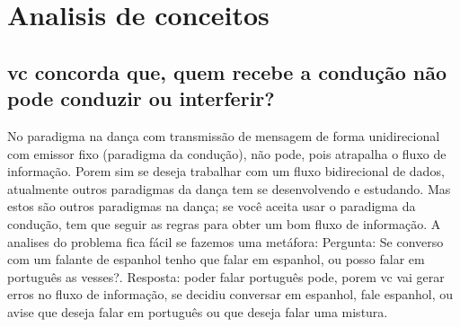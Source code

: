 \documentclass[a4paper,10pt]{article}
\begin{document}
\section{Analisis de conceitos}

\subsection{vc concorda que, quem recebe a condução não pode conduzir ou interferir?﻿}
No paradigma na dança com transmissão de mensagem de forma unidirecional com emissor fixo (paradigma da condução), 
não pode, pois atrapalha o fluxo de informação. 
Porem sim se deseja trabalhar com um fluxo bidirecional de dados, 
atualmente outros paradigmas da dança tem se desenvolvendo e estudando. 
Mas estos são outros paradigmas na dança;
se você aceita usar o paradigma da condução, 
tem que seguir as regras para obter um bom fluxo de informação. 
A analises do problema fica fácil se fazemos uma metáfora: 
Pergunta: Se converso com um falante de espanhol tenho que falar em espanhol, ou posso falar em português as vesses?. 
Resposta: poder falar português pode, porem vc vai gerar erros no fluxo de informação, 
se decidiu conversar em espanhol, fale espanhol, 
ou avise que deseja falar em português ou que deseja falar uma mistura.﻿
\end{document}
